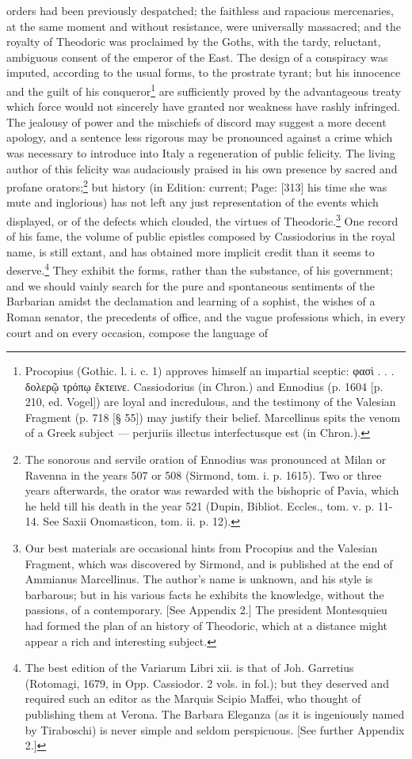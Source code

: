 orders had been previously despatched; the faithless and rapacious mercenaries, at the same moment and without resistance, were universally massacred; and the royalty of Theodoric was proclaimed by the Goths, with the tardy, reluctant, ambiguous consent of the emperor of the East. The design of a conspiracy was imputed, according to the usual forms, to the prostrate tyrant; but his innocence and the guilt of his conqueror\footnote{Procopius (Gothic. l. i. c. 1) approves himself an impartial sceptic: \textgreek{φασ\texthebrew{ὶ} . . . δολερ\texthebrew{ῷ} τρόπ\texthebrew{ῳ ἔ}κτεινε}. Cassiodorius (in Chron.) and Ennodius (p. 1604 [p. 210, ed. Vogel]) are loyal and incredulous, and the testimony of the Valesian Fragment (p. 718 [§ 55]) may justify their belief. Marcellinus spits the venom of a Greek subject \texthebrew{—} perjuriis illectus interfectusque est (in Chron.).} are sufficiently proved by the advantageous treaty which force would not sincerely have granted nor weakness have rashly infringed. The jealousy of power and the mischiefs of discord may suggest a more decent apology, and a sentence less rigorous may be pronounced against a crime which was necessary to introduce into Italy a regeneration of public felicity. The living author of this felicity was audaciously praised in his own presence by sacred and profane orators;\footnote{The sonorous and servile oration of Ennodius was pronounced at Milan or Ravenna in the years 507 or 508 (Sirmond, tom. i. p. 1615). Two or three years afterwards, the orator was rewarded with the bishopric of Pavia, which he held till his death in the year 521 (Dupin, Bibliot. Eccles., tom. v. p. 11-14. See Saxii Onomasticon, tom. ii. p. 12).} but history (in Edition: current; Page: [313] his time she was mute and inglorious) has not left any just representation of the events which displayed, or of the defects which clouded, the virtues of Theodoric.\footnote{Our best materials are occasional hints from Procopius and the Valesian Fragment, which was discovered by Sirmond, and is published at the end of Ammianus Marcellinus. The author\texthebrew{}’s name is unknown, and his style is barbarous; but in his various facts he exhibits the knowledge, without the passions, of a contemporary. [See Appendix 2.] The president Montesquieu had formed the plan of an history of Theodoric, which at a distance might appear a rich and interesting subject.} One record of his fame, the volume of public epistles composed by Cassiodorius in the royal name, is still extant, and has obtained more implicit credit than it seems to deserve.\footnote{The best edition of the Variarum Libri xii. is that of Joh. Garretius (Rotomagi, 1679, in Opp. Cassiodor. 2 vols. in fol.); but they deserved and required such an editor as the Marquis Scipio Maffei, who thought of publishing them at Verona. The Barbara Eleganza (as it is ingeniously named by Tiraboschi) is never simple and seldom perspicuous. [See further Appendix 2.]} They exhibit the forms, rather than the substance, of his government; and we should vainly search for the pure and spontaneous sentiments of the Barbarian amidst the declamation and learning of a sophist, the wishes of a Roman senator, the precedents of office, and the vague professions which, in every court and on every occasion, compose the language of 